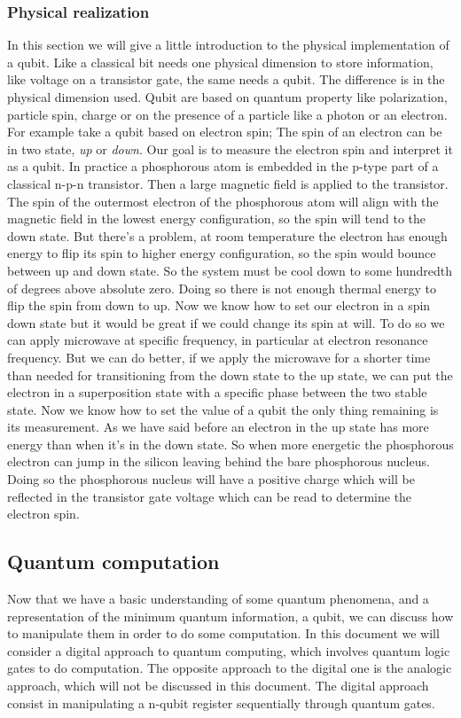 \documentclass[main.tex]{subfiles}
\begin{document}
		\subsubsection{Physical realization}
		In this section we will give a little introduction to the physical implementation of a qubit. Like a classical bit needs
		one physical dimension to store information, like voltage on a transistor gate, the same needs a qubit. The difference is in 
		the physical dimension used. Qubit are based on quantum property like polarization, particle spin, charge or on the presence of a 
		particle like a photon or an electron. 
		For example take a qubit based on electron spin; The spin of an electron can be in two state, \textit{up} or \textit{down}. 
		Our goal is to measure the electron spin and interpret it as a qubit.
		In practice a phosphorous atom is embedded in the p-type part of a classical n-p-n transistor.
		Then a large magnetic field is applied to the transistor. The spin of the outermost electron of the phosphorous atom will 
		align with the magnetic field in the lowest energy configuration, so the spin will tend to the down state. But there's a 
		problem, at room temperature the electron has enough energy to flip its spin to higher energy configuration, so the spin 
		would bounce between up and down state. So the system must be cool down to some hundredth of degrees above absolute zero. 
		Doing so there is not enough thermal energy to flip the spin from down to up. Now we know how to set our electron in a 
		spin down state but it would be great if we could change its spin at will. To do so we can apply microwave at specific 
		frequency, in particular at electron resonance frequency. But we can do better, if we apply the microwave for a shorter time than
		needed for transitioning from the down state to the up state, we can put the electron in a superposition state with a specific phase 
		between the two stable state. Now we know how to set the value of a qubit the only thing remaining is its measurement.
		As we have said before an electron in the up state has more energy than when it's in the down state. So when more energetic the 
		phosphorous electron can jump in the silicon leaving behind the bare phosphorous nucleus. Doing so the phosphorous nucleus will 
		have a positive charge which will be reflected in the transistor gate voltage which can be read to determine the electron spin.
	
	\subsection{Quantum computation}
	Now that we have a basic understanding of some quantum phenomena, and a representation of the minimum quantum information, a qubit, 
	we can discuss how to manipulate them in order to do some computation.
	In this document we will consider a digital approach to quantum computing, which involves quantum logic gates to do computation. 
	The opposite approach to the digital one is the analogic approach, which will not be discussed in this document.
	The digital approach consist in manipulating a n-qubit register sequentially through quantum gates.
	
\end{document}
